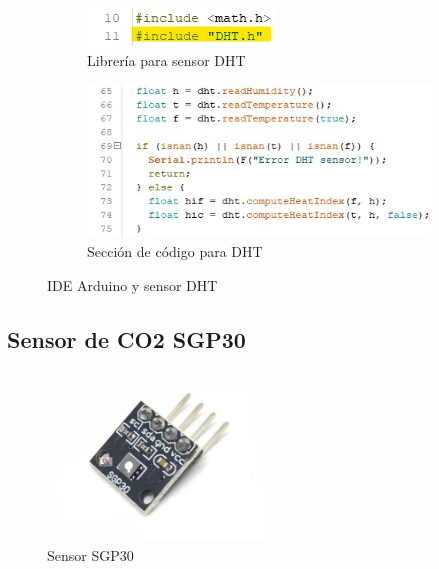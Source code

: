 \begin{figure}[H]
    \centering
    \begin{subfigure}[b]{0.45\linewidth}
    \includegraphics[width=\linewidth]{imagenes/libreria DHT.jpg}
    \caption{Librería para sensor DHT}
    \label{imag:libreria_DHT}
\end{subfigure}
\begin{subfigure}[b]{0.45\linewidth}
    \includegraphics[width=\linewidth]{imagenes/lectura DHT.jpg}
    \caption{Sección de código para DHT}
    \label{imag:codigo_DHT}
\end{subfigure}
    \caption{IDE Arduino y sensor DHT}
    \label{imag:arduino_DHT}
\end{figure}

\subsection{Sensor de CO2 SGP30}

\begin{figure}[H]
      \centering
      \includegraphics[width=6cm, height=4.5cm]{imagenes/sgp30.jpg}
      \caption{Sensor SGP30}
      \label{imag:sgp30}
\end{figure}

